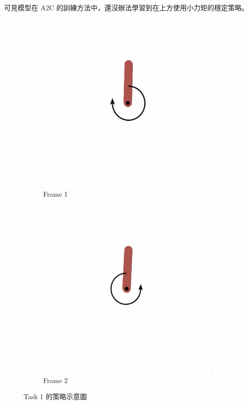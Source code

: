 可見模型在 A2C 的訓練方法中，還沒辦法學習到在上方使用小力矩的穩定策略。

\begin{figure}[h]
    \centering
    \begin{subfigure}[b]{0.48\textwidth}
        \centering
        \includegraphics[width=\textwidth]{figures/task1_frame1.png}
        \caption{Frame 1}
        \label{fig:task1_frame1}
    \end{subfigure}
    \hfill
    \begin{subfigure}[b]{0.48\textwidth}
        \centering
        \includegraphics[width=\textwidth]{figures/task1_frame2.png}
        \caption{Frame 2}
        \label{fig:task1_frame2}
    \end{subfigure}
    \caption{Task 1 的策略示意圖}
    \label{fig:task1_frames}
\end{figure}


